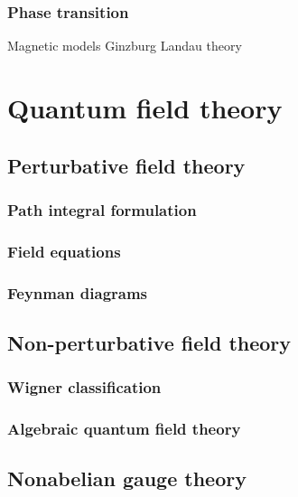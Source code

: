 \documentclass{../note}
\begin{document}
\section{Phase transition}
Magnetic models
Ginzburg Landau theory







\part{Quantum field theory}
\chapter{Perturbative field theory}
\section{Path integral formulation}
\section{Field equations}
\section{Feynman diagrams}

\chapter{Non-perturbative field theory}
\section{Wigner classification}
\section{Algebraic quantum field theory}

\chapter{Nonabelian gauge theory}





\part{}
\end{document}
